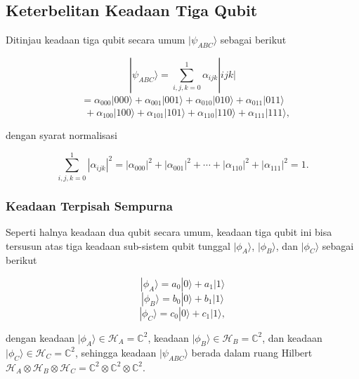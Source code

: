\subsection{Keterbelitan Keadaan Tiga Qubit}
Ditinjau keadaan tiga qubit secara umum $|\psi_{ABC}\rangle$ sebagai berikut

\begin{equation}
|\psi_{ABC}\rangle
=
\sum_{i,j,k=0}^{1}
\alpha_{ijk} |ijk|
\end{equation}
\begin{align*}
=
\alpha_{000} |000\rangle
+ \alpha_{001} |001\rangle
+ \alpha_{010} |010\rangle
+ \alpha_{011} |011\rangle
\end{align*}
\begin{equation}
\quad
+ \alpha_{100} |100\rangle
+ \alpha_{101} |101\rangle
+ \alpha_{110} |110\rangle
+ \alpha_{111} |111\rangle ,
\end{equation}

dengan syarat normalisasi

\begin{equation}
\sum_{i,j,k=0}^{1}
|\alpha_{ijk}|^2
=
|\alpha_{000}|^2
+ |\alpha_{001}|^2
+ \cdots
+ |\alpha_{110}|^2
+ |\alpha_{111}|^2
= 1.
\end{equation}

\subsubsection{Keadaan Terpisah Sempurna}
Seperti halnya keadaan dua qubit secara umum, keadaan tiga qubit ini bisa tersusun atas
tiga keadaan sub-sistem qubit tunggal $|\phi_A\rangle$, $|\phi_B\rangle$, dan $|\phi_C\rangle$
sebagai berikut

\begin{equation}
|\phi_A\rangle = a_0 |0\rangle + a_1 |1\rangle
\end{equation}
\begin{equation}
|\phi_B\rangle = b_0 |0\rangle + b_1 |1\rangle
\end{equation}
\begin{equation}
|\phi_C\rangle = c_0 |0\rangle + c_1 |1\rangle ,
\end{equation}

dengan keadaan $|\phi_A\rangle \in \mathcal{H}_A = \mathbb{C}^2$, keadaan
$|\phi_B\rangle \in \mathcal{H}_B = \mathbb{C}^2$, dan keadaan
$|\phi_C\rangle \in \mathcal{H}_C = \mathbb{C}^2$, sehingga keadaan
$|\psi_{ABC}\rangle$ berada dalam ruang Hilbert
$\mathcal{H}_A \otimes \mathcal{H}_B \otimes \mathcal{H}_C
= \mathbb{C}^2 \otimes \mathbb{C}^2 \otimes \mathbb{C}^2$.

